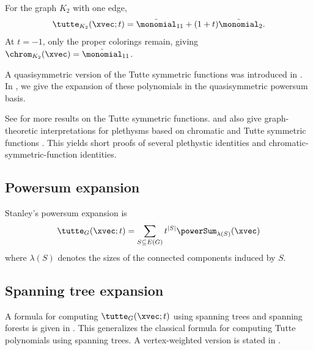 \begin{example}
For the graph $K_2$ with one edge,
\[
 \tutte_{K_2}(\xvec;t) =
 \tilde{\monomial}_{11} + (1+t)\tilde{\monomial}_{2}.
\]
At $t=-1$, only the proper colorings remain, giving
$\chrom_{K_2}(\xvec) = \tilde{\monomial}_{11}$.
\end{example}


A quasisymmetric version of the Tutte symmetric functions
was introduced in \cite{AwanBernardi2016}.
In \cite[Thm. 7.15]{AlexanderssonSulzgruber2019},
we give the expansion of these polynomials in the quasisymmetric powersum basis.


See \cite{CrewSpirkl2020x} for more results on the Tutte symmetric functions.
 and  also give graph-theoretic
interpretations for plethysms based on chromatic and Tutte symmetric
functions \cite{CrewSpirkl2022Plethysm}.  This yields short proofs of several
plethystic identities and chromatic-symmetric-function identities.


\subsection[pExpansionTutte]{Powersum expansion}

Stanley's powersum expansion is
\[
 \tutte_G(\xvec;t) = \sum_{S \subseteq E(G)} t^{|S|} \powerSum_{\lambda(S)}(\xvec)
\]
where $\lambda(S)$ denotes the sizes of the connected components induced by $S$.


\subsection[tutteSpanningTrees]{Spanning tree expansion}

A formula for computing $\tutte_G(\xvec;t)$ using spanning trees and spanning
forests is given in \cite{McDonaldMoffatt2012}.
This generalizes the classical formula for computing Tutte polynomials using
spanning trees.
A vertex-weighted version is stated in \cite[Eq. (15)]{AlistePrietoCrewSpirklZamora2020x}.
